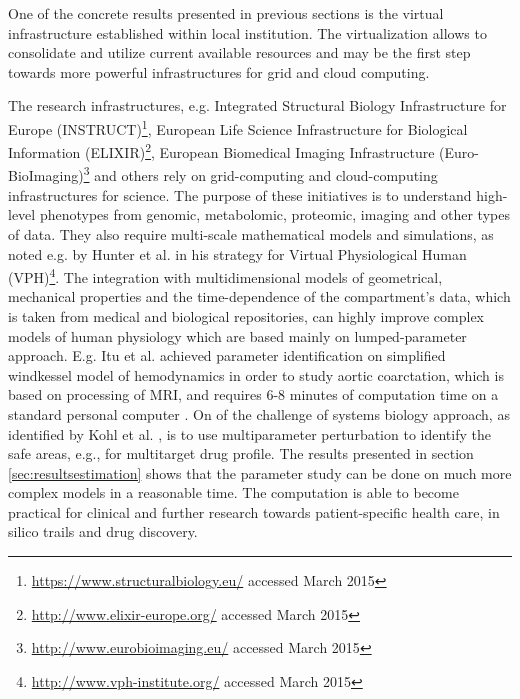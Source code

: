 \begin{itemize}

One of the concrete results presented in previous sections is the virtual infrastructure established within local institution. The virtualization allows to consolidate and utilize current available resources and may be the first step towards more powerful infrastructures for grid and cloud computing.

The research infrastructures, e.g. Integrated Structural Biology Infrastructure for Europe (INSTRUCT)\footnote{\url{https://www.structuralbiology.eu/} accessed March 2015}, European Life Science Infrastructure for Biological Information (ELIXIR)\footnote{\url{http://www.elixir-europe.org/} accessed March 2015},  European Biomedical Imaging Infrastructure (Euro-BioImaging)\footnote{\url{http://www.eurobioimaging.eu/} accessed March 2015} and others rely on grid-computing and cloud-computing infrastructures for science. The purpose of these initiatives is to understand high-level phenotypes from genomic, metabolomic, proteomic, imaging and other types of data. They also require multi-scale mathematical models and simulations, as noted e.g. by Hunter et al. \cite{Hunter2013} in his strategy for Virtual Physiological Human (VPH)\footnote{\url{http://www.vph-institute.org/} accessed March 2015}. 
The integration with multidimensional models of geometrical, mechanical properties and the time-dependence of the compartment's data, which is taken from medical and biological repositories, can highly improve complex models of human physiology which are based mainly on lumped-parameter approach. E.g. Itu et al. achieved parameter identification on simplified windkessel model of hemodynamics in order to study aortic coarctation, which is based on processing of MRI, and requires 6-8 minutes of computation time on a standard personal computer \cite{Itu2013}. On of the challenge of systems biology approach, as identified by Kohl et al. \cite{Kohl2010}, is to use multiparameter perturbation to identify the safe areas, e.g., for multitarget drug profile. The results presented in section \ref{sec:resultsestimation} shows that the parameter study can be done on much more complex models in a reasonable time. The computation is able to become practical for clinical and further research towards patient-specific health care, in silico trails and drug discovery. 


\end{itemize}
